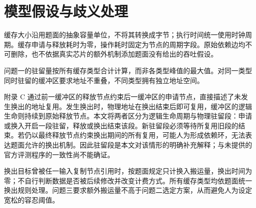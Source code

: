 \section{模型假设与歧义处理}
缓存大小沿用题面的抽象容量单位，不将其转换成字节；执行时间统一使用时钟周期。缓存申请与释放耗时为零，操作耗时固定为节点的周期字段。原始依赖边均不可删除，也不依据真实芯片的额外机制添加题面没有给出的吞吐假设。

问题一的驻留量按所有缓存类型合计计算，而非各类型峰值的最大值。对同一类型同时驻留的缓冲区要求地址不重叠，不同类型拥有独立地址空间。

附录 C 通过前一缓冲区的释放节点约束后一缓冲区的申请节点，直接描述了未发生换出的地址复用。发生换出时，物理地址在换出结束后即可复用，缓冲区的逻辑生命则持续到原始释放节点。本文将两者区分为逻辑生命周期与物理驻留段：申请或换入开启一段驻留，释放或换出结束该段。新驻留段必须等待所复用旧段的结束。若仍以最终释放节点约束换出期间的所有复用，可能人为形成依赖环，无法表达题面允许的换出机制。因此驻留段是本文对该情形的明确补充解释；与未提供的官方评测程序的一致性尚不能确证。

换出目标曾被任一输入复制节点引用时，按题面规定只计换入搬运量，换出时间为零；不自行判断数据是否被后续修改并改变计费方式。所有缓存类型均依题面统一换出规则处理。问题三要求额外搬运量不高于问题二选定方案，从而避免人为设定宽松的容忍阈值。
